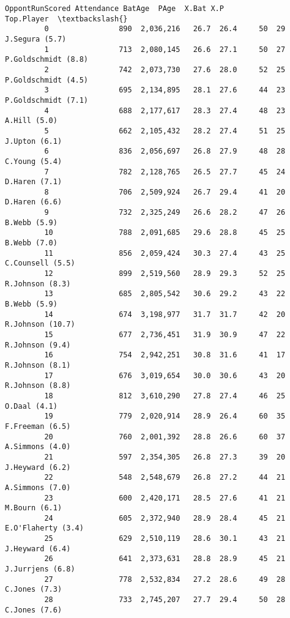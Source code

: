 \documentclass[11pt]{article}
\begin{document}
\begin{Verbatim}[commandchars=\\\{\}]
              OppontRunScored Attendance BatAge  PAge  X.Bat X.P           Top.Player  \textbackslash{}
         0                890  2,036,216   26.7  26.4     50  29       J.Segura (5.7)   
         1                713  2,080,145   26.6  27.1     50  27  P.Goldschmidt (8.8)   
         2                742  2,073,730   27.6  28.0     52  25  P.Goldschmidt (4.5)   
         3                695  2,134,895   28.1  27.6     44  23  P.Goldschmidt (7.1)   
         4                688  2,177,617   28.3  27.4     48  23         A.Hill (5.0)   
         5                662  2,105,432   28.2  27.4     51  25        J.Upton (6.1)   
         6                836  2,056,697   26.8  27.9     48  28        C.Young (5.4)   
         7                782  2,128,765   26.5  27.7     45  24        D.Haren (7.1)   
         8                706  2,509,924   26.7  29.4     41  20        D.Haren (6.6)   
         9                732  2,325,249   26.6  28.2     47  26         B.Webb (5.9)   
         10               788  2,091,685   29.6  28.8     45  25         B.Webb (7.0)   
         11               856  2,059,424   30.3  27.4     43  25     C.Counsell (5.5)   
         12               899  2,519,560   28.9  29.3     52  25      R.Johnson (8.3)   
         13               685  2,805,542   30.6  29.2     43  22         B.Webb (5.9)   
         14               674  3,198,977   31.7  31.7     42  20     R.Johnson (10.7)   
         15               677  2,736,451   31.9  30.9     47  22      R.Johnson (9.4)   
         16               754  2,942,251   30.8  31.6     41  17      R.Johnson (8.1)   
         17               676  3,019,654   30.0  30.6     43  20      R.Johnson (8.8)   
         18               812  3,610,290   27.8  27.4     46  25         O.Daal (4.1)   
         19               779  2,020,914   28.9  26.4     60  35      F.Freeman (6.5)   
         20               760  2,001,392   28.8  26.6     60  37      A.Simmons (4.0)   
         21               597  2,354,305   26.8  27.3     39  20      J.Heyward (6.2)   
         22               548  2,548,679   26.8  27.2     44  21      A.Simmons (7.0)   
         23               600  2,420,171   28.5  27.6     41  21        M.Bourn (6.1)   
         24               605  2,372,940   28.9  28.4     45  21   E.O'Flaherty (3.4)   
         25               629  2,510,119   28.6  30.1     43  21      J.Heyward (6.4)   
         26               641  2,373,631   28.8  28.9     45  21     J.Jurrjens (6.8)   
         27               778  2,532,834   27.2  28.6     49  28        C.Jones (7.3)   
         28               733  2,745,207   27.7  29.4     50  28        C.Jones (7.6)   

\end{Verbatim}
\end{document}
